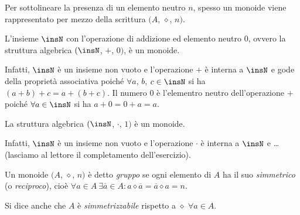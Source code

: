 Per sottolineare la presenza di un elemento neutro $n$, spesso un monoide viene rappresentato per mezzo della scrittura $(A$, $\diamond$, $n)$.

\begin{exrig}
 \begin{esempio}
L'insieme $\insN$ con l'operazione di addizione ed elemento neutro 0, ovvero la struttura algebrica $(\insN$, $+$, $0)$, è un monoide.

Infatti, $\insN$ è un insieme non vuoto e l'operazione $+$ è interna a $\insN$ e gode della proprietà associativa poiché $\forall a$, $b$, $c\in\insN$ si ha $(a+b)+c=a+(b+c)$. Il numero 0 è l'elementro neutro dell'operazione $+$ poiché $\forall a\in\insN$ si ha $a+0=0+a=a$.
 \end{esempio}
 
 \begin{esempio}
La struttura algebrica $(\insN$, $\cdot$, $1)$ è un monoide.

Infatti, $\insN$ è un insieme non vuoto e l'operazione $\cdot$ è interna a $\insN$ e \ldots (lasciamo al lettore il completamento dell'esercizio).
 \end{esempio}
\end{exrig}

\begin{definizione}
Un monoide $(A$, $\diamond$, $n)$ è detto \emph{gruppo} se ogni elemento di $A$ ha il suo \emph{simmetrico} (o \emph{reciproco}), cioè $\forall a \in A\: \exists \overline{a} \in A : a\diamond\overline{a} = \overline{a}\diamond a = n$.

Si dice anche che $A$ è \emph{simmetrizzabile} rispetto a $\diamond$ $\forall a \in A$.
\end{definizione}

